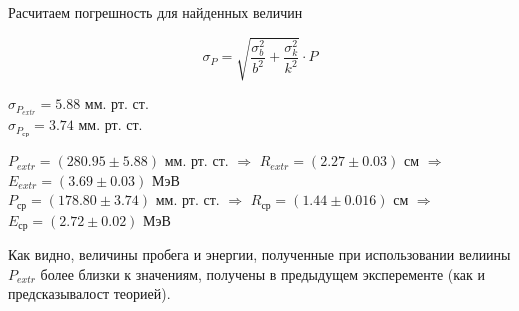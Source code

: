     Расчитаем погрешность для найденных величин

    \[ \sigma_P = \sqrt{\frac{\sigma_b^2}{b^2} + \frac{\sigma_k^2}{k^2}} \cdot P \]

    \begin{center}
        $\sigma_{P_{extr}}        = 5.88$ мм. рт. ст. \\
        $\sigma_{P_{\text{ср}}} = 3.74$ мм. рт. ст. \\
    \end{center}

    \begin{center}
        $P_{extr} = (280.95 \pm 5.88)$ мм. рт. ст. $\Rightarrow$ $R_{extr} = (2.27 \pm 0.03)$ см $\Rightarrow$ $E_{extr} = (3.69 \pm 0.03)$ МэВ\\
        $P_{\text{ср}} = (178.80 \pm 3.74)$ мм. рт. ст. $\Rightarrow$ $R_{\text{ср}} = (1.44 \pm 0.016)$ см $\Rightarrow$ $E_{\text{ср}}  = (2.72 \pm 0.02)$ МэВ
    \end{center}


    Как видно, величины пробега и энергии, полученные при использовании велиины $P_{extr}$ более близки
    к значениям, получены в предыдущем эксперементе (как и предсказывалост теорией).
